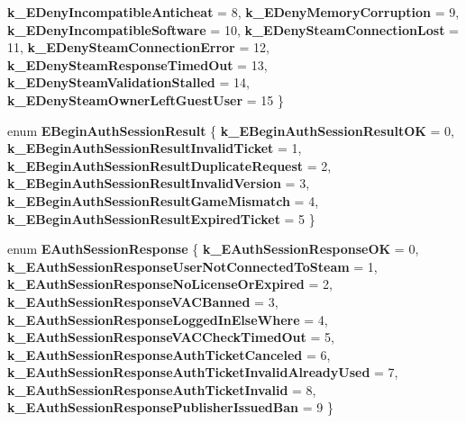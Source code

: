 \begin{DoxyCompactItemize}
\newline
{\bfseries k\+\_\+\+E\+Deny\+Incompatible\+Anticheat} = 8, 
{\bfseries k\+\_\+\+E\+Deny\+Memory\+Corruption} = 9, 
{\bfseries k\+\_\+\+E\+Deny\+Incompatible\+Software} = 10, 
{\bfseries k\+\_\+\+E\+Deny\+Steam\+Connection\+Lost} = 11, 
\newline
{\bfseries k\+\_\+\+E\+Deny\+Steam\+Connection\+Error} = 12, 
{\bfseries k\+\_\+\+E\+Deny\+Steam\+Response\+Timed\+Out} = 13, 
{\bfseries k\+\_\+\+E\+Deny\+Steam\+Validation\+Stalled} = 14, 
{\bfseries k\+\_\+\+E\+Deny\+Steam\+Owner\+Left\+Guest\+User} = 15
 \}
\item 
\mbox{\label{namespace_valve_1_1_steamworks_a7e1788daf42c43ac09d8e71ea282109f}} 
enum {\bfseries E\+Begin\+Auth\+Session\+Result} \{ \newline
{\bfseries k\+\_\+\+E\+Begin\+Auth\+Session\+Result\+OK} = 0, 
{\bfseries k\+\_\+\+E\+Begin\+Auth\+Session\+Result\+Invalid\+Ticket} = 1, 
{\bfseries k\+\_\+\+E\+Begin\+Auth\+Session\+Result\+Duplicate\+Request} = 2, 
{\bfseries k\+\_\+\+E\+Begin\+Auth\+Session\+Result\+Invalid\+Version} = 3, 
\newline
{\bfseries k\+\_\+\+E\+Begin\+Auth\+Session\+Result\+Game\+Mismatch} = 4, 
{\bfseries k\+\_\+\+E\+Begin\+Auth\+Session\+Result\+Expired\+Ticket} = 5
 \}
\item 
\mbox{\label{namespace_valve_1_1_steamworks_a084140370df88c8563129265cafb7431}} 
enum {\bfseries E\+Auth\+Session\+Response} \{ \newline
{\bfseries k\+\_\+\+E\+Auth\+Session\+Response\+OK} = 0, 
{\bfseries k\+\_\+\+E\+Auth\+Session\+Response\+User\+Not\+Connected\+To\+Steam} = 1, 
{\bfseries k\+\_\+\+E\+Auth\+Session\+Response\+No\+License\+Or\+Expired} = 2, 
{\bfseries k\+\_\+\+E\+Auth\+Session\+Response\+V\+A\+C\+Banned} = 3, 
\newline
{\bfseries k\+\_\+\+E\+Auth\+Session\+Response\+Logged\+In\+Else\+Where} = 4, 
{\bfseries k\+\_\+\+E\+Auth\+Session\+Response\+V\+A\+C\+Check\+Timed\+Out} = 5, 
{\bfseries k\+\_\+\+E\+Auth\+Session\+Response\+Auth\+Ticket\+Canceled} = 6, 
{\bfseries k\+\_\+\+E\+Auth\+Session\+Response\+Auth\+Ticket\+Invalid\+Already\+Used} = 7, 
\newline
{\bfseries k\+\_\+\+E\+Auth\+Session\+Response\+Auth\+Ticket\+Invalid} = 8, 
{\bfseries k\+\_\+\+E\+Auth\+Session\+Response\+Publisher\+Issued\+Ban} = 9
 \}
\item 

\end{DoxyCompactItemize}
